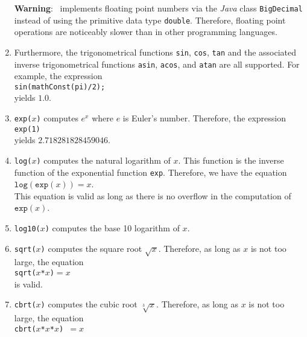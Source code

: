 \begin{enumerate}
      \textbf{Warning}:  \setlx\ implements floating point numbers via the \textsl{Java}
      class \texttt{BigDecimal} instead of using the primitive data type \texttt{double}.
      Therefore, floating point operations are noticeably slower than in other
      programming languages.
\item Furthermore, the trigonometrical functions \texttt{sin}, \texttt{cos}, \texttt{tan}
      and the associated inverse trigonometrical functions 
      \texttt{asin}, 
      \texttt{acos}, and 
      \texttt{atan}
      are all supported.  For example, the expression
      \\[0.2cm]
      \hspace*{1.3cm}
      \texttt{sin(mathConst(pi)/2);}
      \\[0.2cm]
      yields $1.0$.
\item \texttt{exp($x$)} computes $e^x$ where $e$ is Euler's number.  Therefore, the
      expression 
      \\[0.2cm]
      \hspace*{1.3cm}
      \texttt{exp(1)}
      \\[0.2cm]
      yields $2.718281828459046$.
\item \texttt{log($x$)} computes the natural logarithm of $x$.  This function is the
      inverse function of the exponential function \texttt{exp}.  Therefore, we have
      the equation
      \\[0.2cm]
      \hspace*{1.3cm}
      $\mathtt{log}(\mathtt{exp}(x)) = x$.
      \\[0.2cm]
      This equation is valid as long as there is no overflow in the computation of
      $\mathtt{exp}(x)$.
\item \texttt{log10($x$)} computes the base 10 logarithm of $x$.
\item \texttt{sqrt($x$)} computes the square root $\sqrt{x}$.  Therefore, as long as $x$
      is not too large, the equation
      \\[0.2cm]
      \hspace*{1.3cm}
      \texttt{sqrt($x$*$x$)$=x$}
      \\[0.2cm]
      is valid.
\item \texttt{cbrt($x$)} computes the cubic root $\sqrt[3]{x}$.  Therefore, as long as $x$
      is not too large, the equation
      \\[0.2cm]
      \hspace*{1.3cm}
      \texttt{cbrt($x$*$x$*$x$) $= x$}
      \\[0.2cm]

\end{enumerate}

